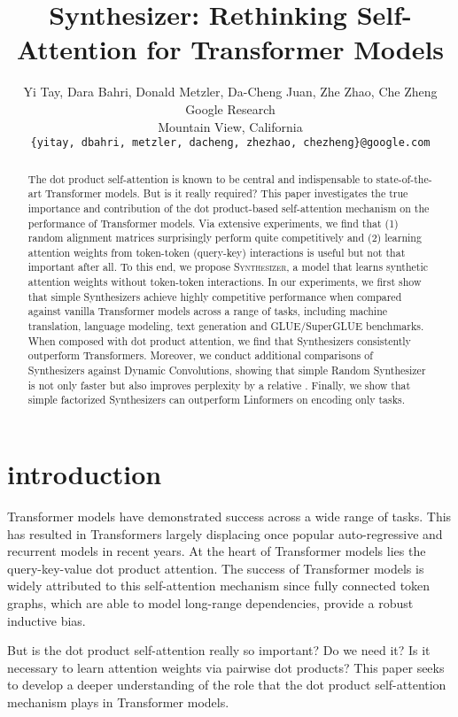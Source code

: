 \documentclass{article} \usepackage{iclr2021_conference,times}
\title{Synthesizer: Rethinking Self-Attention for Transformer Models}
\author{Yi Tay, Dara Bahri, Donald Metzler, Da-Cheng Juan, Zhe Zhao, Che Zheng\\
Google Research\\
Mountain View, California \\
\texttt{\{yitay, dbahri, metzler, dacheng, zhezhao, chezheng\}@google.com} \\
}
\begin{document}
\maketitle

\begin{abstract}
The dot product self-attention is known to be central and indispensable to state-of-the-art Transformer models. But is it really required? This paper investigates the true importance and contribution of the dot product-based self-attention mechanism on the performance of Transformer models. Via extensive experiments, we find that (1) random alignment matrices surprisingly perform quite competitively and (2) learning attention weights from token-token (query-key) interactions is useful but not that important after all. To this end, we propose \textsc{Synthesizer}, a model that learns synthetic attention weights without token-token interactions. In our experiments, we first show that simple Synthesizers achieve highly competitive performance when compared against vanilla Transformer models across a range of tasks, including machine translation, language modeling, text generation and GLUE/SuperGLUE benchmarks. When composed with dot product attention, we find that Synthesizers consistently outperform Transformers. Moreover, we conduct additional comparisons of Synthesizers against Dynamic Convolutions, showing that simple Random Synthesizer is not only  faster but also improves perplexity by a relative . Finally, we show that simple factorized Synthesizers can outperform Linformers on encoding only tasks. 
\end{abstract}

\section{introduction}

Transformer models \citep{vaswani2017attention} have demonstrated success across a wide range of tasks. This has resulted in Transformers largely displacing once popular auto-regressive and recurrent models in recent years. At the heart of Transformer models lies the query-key-value dot product attention.  The success of Transformer models is widely attributed to this self-attention mechanism since fully connected token graphs, which are able to model long-range dependencies, provide a robust inductive bias.

But is the dot product self-attention really so important? Do we need it? Is it necessary to learn attention weights  via pairwise dot products? This paper seeks to develop a deeper understanding of the role that the dot product self-attention mechanism plays in Transformer models. 
\end{document}
